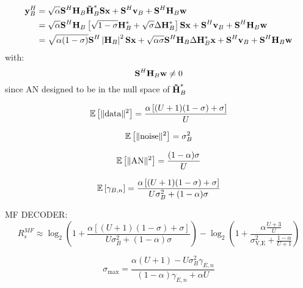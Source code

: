 \documentclass[12pt]{article}
\begin{document}
\begin{equation}
	\begin{split}
	\boldsymbol{\mathrm{y}}_B^H &= \sqrt{\alpha} \boldsymbol{\mathrm{S}}^H \boldsymbol{\mathrm{H}}_B \boldsymbol{\mathrm{\tilde{H}}}_B^* \boldsymbol{\mathrm{S}} \boldsymbol{\mathrm{x}} + \boldsymbol{\mathrm{S}}^H \boldsymbol{\mathrm{v}}_B + \boldsymbol{\mathrm{S}}^H \boldsymbol{\mathrm{H}}_B \boldsymbol{\mathrm{w}} \\
	&=\sqrt{\alpha} \boldsymbol{\mathrm{S}}^H \boldsymbol{\mathrm{H}}_B \left[ \sqrt{1-\sigma} \boldsymbol{\mathrm{H}}_B^*  + \sqrt{\sigma} \Delta \boldsymbol{\mathrm{H}}_B^*   \right]\boldsymbol{\mathrm{S}} \boldsymbol{\mathrm{x}} + \boldsymbol{\mathrm{S}}^H \boldsymbol{\mathrm{v}}_B + \boldsymbol{\mathrm{S}}^H \boldsymbol{\mathrm{H}}_B \boldsymbol{\mathrm{w}} \\
	&=\sqrt{\alpha(1-\sigma)} \boldsymbol{\mathrm{S}}^H \left|\boldsymbol{\mathrm{H}}_B\right|^2 \boldsymbol{\mathrm{S}} \boldsymbol{\mathrm{x}}   + \sqrt{\alpha\sigma} \boldsymbol{\mathrm{S}}^H  \boldsymbol{\mathrm{H}}_B \Delta \boldsymbol{\mathrm{H}}_B^*  \boldsymbol{\mathrm{x}} + \boldsymbol{\mathrm{S}}^H \boldsymbol{\mathrm{v}}_B + \boldsymbol{\mathrm{S}}^H \boldsymbol{\mathrm{H}}_B \boldsymbol{\mathrm{w}}
	\end{split}
\end{equation}
with:
\begin{equation}
\boldsymbol{\mathrm{S}}^H \boldsymbol{\mathrm{H}}_B \boldsymbol{\mathrm{w}} \neq 0 
\end{equation}
since AN designed to be in the null space of $\boldsymbol{\mathrm{\tilde{H}}}_B^*$


\begin{equation}
	\mathbb{E} \left[\| \text{data} \|^2\right] = \frac{\alpha\left[ (U+1)(1-\sigma) + \sigma \right]}{U}
\end{equation}

\begin{equation}
\mathbb{E} \left[\| \text{noise} \|^2\right] = \sigma^2_{B}
\end{equation}

\begin{equation}
\mathbb{E} \left[\| \text{AN} \|^2\right] =\frac{(1-\alpha)\sigma}{U}
\end{equation}


\begin{equation}
\mathbb{E} \left[\gamma_{B,n}\right] =\frac{\alpha\left[ (U+1)(1-\sigma) + \sigma \right]}{ U\sigma^2_{B}  + (1-\alpha)\sigma}
\end{equation}

MF DECODER:
\begin{equation}
	R_s^{MF} \approx \log_2 \left( 1 +  \frac{\alpha\left[ (U+1)(1-\sigma) + \sigma \right]}{ U\sigma^2_{B}  + (1-\alpha)\sigma}\right) - \log_2\left( 1 +  \frac{\alpha \frac{U+3}{U}}{\sigma^2_{\text{V,E}} + \frac{1-\alpha}{U+1}}\right)
\end{equation}

\begin{equation}
	\sigma_{\text{max}} = \frac{\alpha(U+1)-U\sigma_B^2 \gamma_{E,n}}{(1-\alpha)\gamma_{E,n} + \alpha U}
\end{equation}
\end{document}
